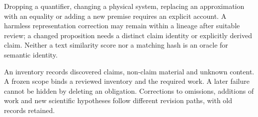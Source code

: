  Dropping a quantifier, changing a physical system, replacing an approximation with an equality or adding a new premise requires an explicit account. A harmless representation correction may remain within a lineage after suitable review; a changed proposition needs a distinct claim identity or explicitly derived claim. Neither a text similarity score nor a matching hash is an oracle for semantic identity.

 An inventory records discovered claims, non-claim material and unknown content. A frozen scope binds a reviewed inventory and the required work. A later failure cannot be hidden by deleting an obligation. Corrections to omissions, additions of work and new scientific hypotheses follow different revision paths, with old records retained.

